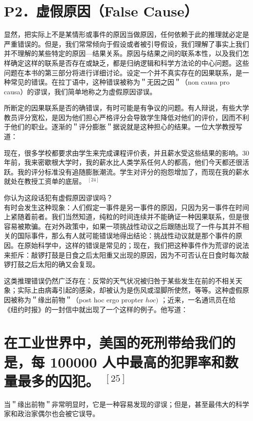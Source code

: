 \section*{P2．虚假原因（False Cause）}
显然，把实际上不是某情形或事件的原因当做原因，任何依赖于此的推理就必定是严重错误的。但是，我们常常倾向于假设或者被引导假设，我们理解了事实上我们并不理解的某些特定的原因—结果关系。原因与结果之间的联系本性，以及我们怎样确定这样的联系是否存在或缺乏，都是归纳逻辑和科学方法论的中心问题。这些问题在本书的第三部分将进行详细讨论。设定一个并不真实存在的因果联系，是一种常见的错误。在拉丁语中，这种错误被称为＂无因之因＂（non causa pro causa）的谬误，我们简单地称之为虚假原因谬误。

所断定的因果联系是否的确错误，有时可能是有争议的问题。有人辩说，有些大学教员评分宽松，是因为他们担心严格评分会导致学生降低对他们的评价，因而不利于他们的职业。逐渐的＂评分膨胀＂据说就是这种担心的结果。一位大学教授写道：

现在，很多学校都要求由学生来完成课程评价表，并且薪水受这些结果的影响。30年前，我来密歇根大学时，我的薪水比人类学系任何人的都高，他们今天都还很活跃。我的评分标准没有追随膨胀潮流。学生对评分的抱怨增加了，而现在我的薪水就处在教授工资单的底层。 ${ }^{[24]}$

你认为这段话犯有虚假原因谬误吗？\\
有时会发生这种现象：人们假定一事件是另一事件的原因，只因为另一事件在时间上紧随着前者。我们当然知道，纯粒的时间连续并不能确证一种因果联系，但是很容易被欺骗。在对外政策中，如果一项挑战性动议之后跟随出现了一件与其并不相关的国际事件，那么有人就可能错误地得出结论：挑战性动议就是那个事件的原因。在原始科学中，这样的错误是常见的；现在，我们把这种事件作为荒谬的说法来拒斥：敲锣打鼓是日食之后太阳重又出现的原因，因为不可否认在日食时每次敲锣打鼓之后太阳的确又会复现。

这类推理错误仍然广泛存在：反常的天气状况被归咎于某些发生在前的不相关天象；实际上由病毒引起的感染，却被认为是伤风或湿脚所使然，等等。这种虚假原因被称为＂缘出前物＂（post hoc ergo propter $h o c)$ ；近来，一名通讯员在给《纽约时报》的一封信中就出现了一个这样的例子。他写道：

\section*{在工业世界中，美国的死刑带给我们的是，每 100000 人中最高的犯罪率和数量最多的囚犯。 ${ }^{[25]}$}
当＂缘出前物＂非常明显时，它是一种容易发现的谬误；但是，甚至最伟大的科学家和政治家偶尔也会被它误导。 
